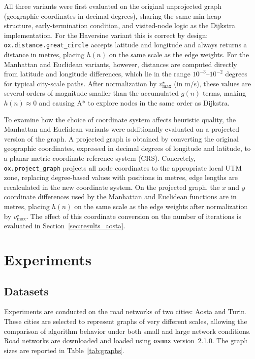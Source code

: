 \documentclass[12pt,a4paper]{article}
\begin{document}
All three variants were first evaluated on the original unprojected graph (geographic coordinates in decimal degrees), sharing the same min-heap structure, early-termination condition, and visited-node logic as the Dijkstra implementation.
For the Haversine variant this is correct by design: \texttt{ox.distance.great\_circle} accepts latitude and longitude and always returns a distance in metres, placing $h(n)$ on the same scale as the edge weights.
For the Manhattan and Euclidean variants, however, distances are computed directly from latitude and longitude differences, which lie in the range $10^{-3}$--$10^{-2}$ degrees for typical city-scale paths.
After normalization by $v_{\max}^{\star}$ (in m/s), these values are several orders of magnitude smaller than the accumulated $g(n)$ terms, making $h(n) \approx 0$ and causing A* to explore nodes in the same order as Dijkstra.

To examine how the choice of coordinate system affects heuristic quality, the Manhattan and Euclidean variants were additionally evaluated on a projected version of the graph.
A projected graph is obtained by converting the original geographic coordinates, expressed in decimal degrees of longitude and latitude, to a planar metric coordinate reference system (CRS).
Concretely, \texttt{ox.project\_graph} projects all node coordinates to the appropriate local UTM zone, replacing degree-based values with positions in metres, edge lengths are recalculated in the new coordinate system.
On the projected graph, the $x$ and $y$ coordinate differences used by the Manhattan and Euclidean functions are in metres, placing $h(n)$ on the same scale as the edge weights after normalization by $v_{\max}^{\star}$.
The effect of this coordinate conversion on the number of iterations is evaluated in Section~\ref{sec:results_aosta}.

\section{Experiments}

\subsection{Datasets}

Experiments are conducted on the road networks of two cities: Aosta and Turin.
These cities are selected to represent graphs of very different scales, allowing the comparison of algorithm behavior under both small and large network conditions.
Road networks are downloaded and loaded using \texttt{osmnx} version~2.1.0.
The graph sizes are reported in Table~\ref{tab:graphs}.
\end{document}
